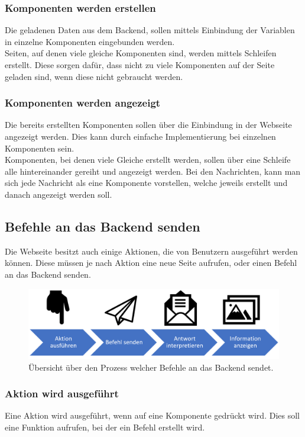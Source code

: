 \subsubsection{Komponenten werden erstellen}
Die geladenen Daten aus dem Backend, sollen mittels Einbindung der Variablen in einzelne Komponenten eingebunden werden.\\Seiten, auf denen viele gleiche Komponenten sind, werden mittels Schleifen erstellt. Diese sorgen dafür, dass nicht zu viele Komponenten auf der Seite geladen sind, wenn diese nicht gebraucht werden.

\subsubsection{Komponenten werden angezeigt}
Die bereits erstellten Komponenten sollen über die Einbindung in der Webseite angezeigt werden. Dies kann durch einfache Implementierung bei einzelnen Komponenten sein.\\Komponenten, bei denen viele Gleiche erstellt werden, sollen über eine Schleife alle hintereinander gereiht und angezeigt werden.
Bei den Nachrichten, kann man sich jede Nachricht als eine Komponente vorstellen, welche jeweils erstellt und danach angezeigt werden soll.
\newpage
\subsection{Befehle an das Backend senden}
Die Webseite besitzt auch einige Aktionen, die von Benutzern ausgeführt werden können. Diese müssen je nach Aktion eine neue Seite aufrufen, oder einen Befehl an das Backend senden.

\begin{figure}[H]
	\centering
	\includegraphics[width=0.8\linewidth]{images/Prozess_Befehl_senden}
	\caption[Prozess der Befehlssendung]{Übersicht über den Prozess welcher Befehle an das Backend sendet.}
	\label{fig:prozessbefehlsenden}
\end{figure}

\subsubsection{Aktion wird ausgeführt}
Eine Aktion wird ausgeführt, wenn auf eine Komponente gedrückt wird. Dies soll eine Funktion aufrufen, bei der ein Befehl erstellt wird.

